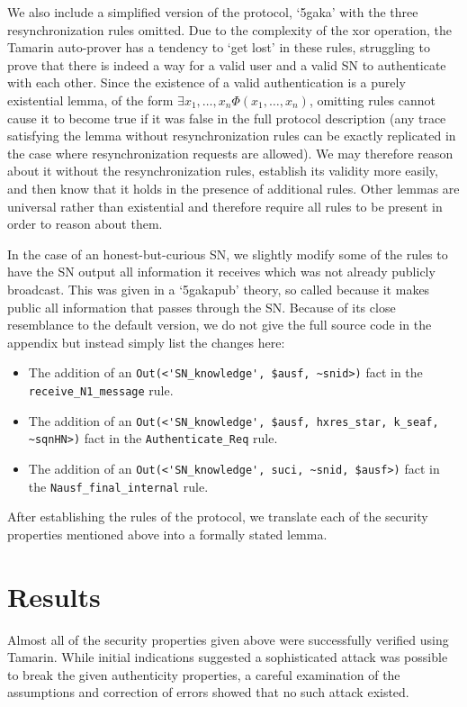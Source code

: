 \documentclass[10pt, pdftex]{article}
\begin{document}
We also include a simplified version of the protocol, `5gaka' with the three resynchronization rules omitted. Due to the complexity of the xor operation, the Tamarin auto-prover has a tendency to `get lost' in these rules, struggling to prove that there is indeed a way for a valid user and a valid SN to authenticate with each other. Since the existence of a valid authentication is a purely existential lemma, of the form $\exists x_1, \ldots, x_n \Phi(x_1, \ldots, x_n)$, omitting rules cannot cause it to become true if it was false in the full protocol description (any trace satisfying the lemma without resynchronization rules can be exactly replicated in the case where resynchronization requests are allowed). We may therefore reason about it without the resynchronization rules, establish its validity more easily, and then know that it holds in the presence of additional rules. Other lemmas are universal rather than existential and therefore require all rules to be present in order to reason about them.

In the case of an honest-but-curious SN, we slightly modify some of the rules to have the SN output all information it receives which was not already publicly broadcast. This was given in a `5gaka\textunderscore pub' theory, so called because it makes public all information that passes through the SN. Because of its close resemblance to the default version, we do not give the full source code in the appendix but instead simply list the changes here:

\begin{itemize}
 \item The addition of an \verb|Out(<'SN_knowledge', $ausf, ~snid>)| fact in the \verb|receive_N1_message| rule.
 \item The addition of an \verb|Out(<'SN_knowledge', $ausf, hxres_star, k_seaf, ~sqnHN>)| fact in the \verb|Authenticate_Req| rule.
 \item The addition of an \verb|Out(<'SN_knowledge', suci, ~snid, $ausf>)| fact in the \verb|Nausf_final_internal| rule.
\end{itemize}

After establishing the rules of the protocol, we translate each of the security properties mentioned above into a formally stated lemma.

\section{Results}

Almost all of the security properties given above were successfully verified using Tamarin. While initial indications suggested a sophisticated attack was possible to break the given authenticity properties, a careful examination of the assumptions and correction of errors showed that no such attack existed.
\end{document}
